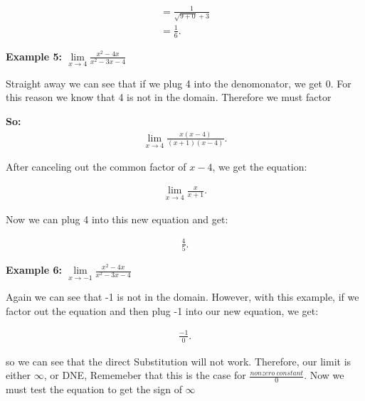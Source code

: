 \documentclass{report}
\begin{document}
    \begin{align*}
        = \frac{1}{\sqrt{9+0}+3} \\
        = \frac{1}{6}
    .\end{align*}

    \bigbreak \noindent \bigbreak \noindent 
    \begin{large}
       \textbf{Example 5: $\lim\limits_{x \to 4}{ \frac{x^2-4x}{x^2-3x-4}}$} 
    \end{large}
   
    \bigbreak \noindent 
    Straight away we can see that if we plug 4 into the denomonator, we get 0. For this reason
    we know that 4 is not in the domain. Therefore we must factor
    
    \bigbreak \noindent 
    \textbf{So:}
    \begin{align*}
       \lim\limits_{x \to 4}{ \frac{x \left(x-4\right)}{ \left(x+1\right) \left(x-4\right)}} 
    .\end{align*}

    \bigbreak \noindent 
    After canceling out the common factor of $x-4$, we get the equation:

    \begin{align*}
        \lim\limits_{x \to 4}{ \frac{x}{x+1}}
    .\end{align*}

    \bigbreak \noindent 
    Now we can plug 4 into this new equation and get:

    \begin{align*}
        \frac{4}{5}
    .\end{align*}

    \bigbreak \noindent \bigbreak \noindent 
   \begin{large}
      \textbf{Example 6: $\lim\limits_{x \to -1}{ \frac{x^2-4x}{x^2-3x-4}}$} 
   \end{large}

   \bigbreak \noindent 
   Again we can see that -1 is not in the domain. However, with this example, if we factor
   out the equation and then plug -1 into our new equation, we get:

   \begin{align*}
       \frac{-1}{0}
   .\end{align*}
    
   \bigbreak \noindent 
   so we can see that the direct Substitution will not work. Therefore, our limit is either 
   $\infty$, or DNE, Rememeber that this is the case for $\frac{nonzero\ constant}{0}$. 
   Now we must test the equation to get the sign of $\infty$
\end{document}
